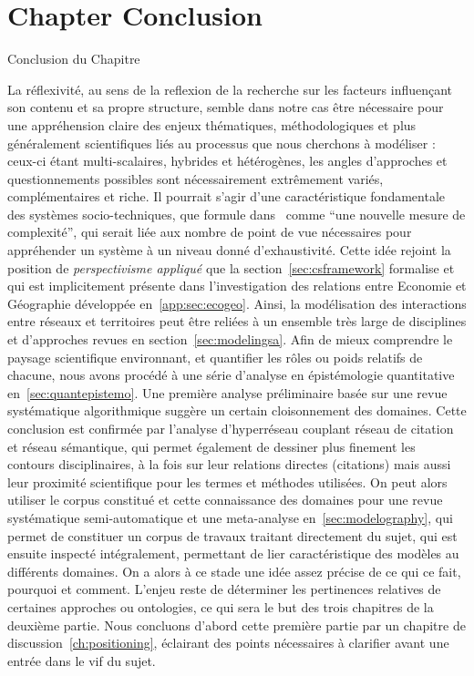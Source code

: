 







\newpage


\section*{Chapter Conclusion}{Conclusion du Chapitre}

La réflexivité, au sens de la reflexion de la recherche sur les facteurs influençant son contenu et sa propre structure, semble dans notre cas être nécessaire pour une appréhension claire des enjeux thématiques, méthodologiques et plus généralement scientifiques liés au processus que nous cherchons à modéliser : ceux-ci étant multi-scalaires, hybrides et hétérogènes, les angles d'approches et questionnements possibles sont nécessairement extrêmement variés, complémentaires et riche. Il pourrait s'agir d'une caractéristique fondamentale des systèmes socio-techniques, que  formule dans~\cite{pumain2005cumulativite} comme ``une nouvelle mesure de complexité'', qui serait liée aux nombre de point de vue nécessaires pour appréhender un système à un niveau donné d'exhaustivité. Cette idée rejoint la position de \emph{perspectivisme appliqué} que la section~\ref{sec:csframework} formalise et qui est implicitement présente dans l'investigation des relations entre Economie et Géographie développée en~\ref{app:sec:ecogeo}. Ainsi, la modélisation des interactions entre réseaux et territoires peut être reliées à un ensemble très large de disciplines et d'approches revues en section~\ref{sec:modelingsa}. Afin de mieux comprendre le paysage scientifique environnant, et quantifier les rôles ou poids relatifs de chacune, nous avons procédé à une série d'analyse en épistémologie quantitative en~\ref{sec:quantepistemo}. Une première analyse préliminaire basée sur une revue systématique algorithmique suggère un certain cloisonnement des domaines. Cette conclusion est confirmée par l'analyse d'hyperréseau couplant réseau de citation et réseau sémantique, qui permet également de dessiner plus finement les contours disciplinaires, à la fois sur leur relations directes (citations) mais aussi leur proximité scientifique pour les termes et méthodes utilisées. On peut alors utiliser le corpus constitué et cette connaissance des domaines pour une revue systématique semi-automatique et une meta-analyse en~\ref{sec:modelography}, qui permet de constituer un corpus de travaux traitant directement du sujet, qui est ensuite inspecté intégralement, permettant de lier caractéristique des modèles au différents domaines. On a alors à ce stade une idée assez précise de ce qui ce fait, pourquoi et comment. L'enjeu reste de déterminer les pertinences relatives de certaines approches ou ontologies, ce qui sera le but des trois chapitres de la deuxième partie. Nous concluons d'abord cette première partie par un chapitre de discussion~\ref{ch:positioning}, éclairant des points nécessaires à clarifier avant une entrée dans le vif du sujet.






\stars

